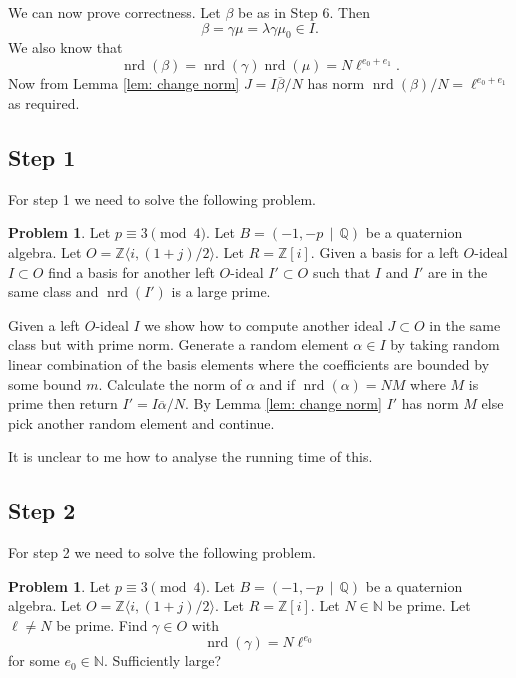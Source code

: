 \documentclass[10pt]{article}
\theoremstyle{plain}
\theoremstyle{definition}
\newtheorem{prob}[theorem]{Problem}
\newcommand{\op}{\operatorname}
\newcommand{\N}{\mathbb{N}}
\newcommand{\Z}{\mathbb{Z}}
\newcommand{\Q}{\mathbb{Q}}
\newcommand{\nrd}{\op{nrd}}
\begin{document}
We can now prove correctness.
Let \( \beta \) be as in Step 6.
Then
\[
    \beta = \gamma \mu = \lambda\gamma\mu_0 \in I.
\]
We also know that
\[
    \nrd(\beta) = \nrd(\gamma) \nrd(\mu) = N\ell^{e_0 + e_1} .
\]
Now from Lemma \ref{lem: change norm} \( J = I\overline{\beta}/N \) has norm \( \nrd(\beta) / N = \ell^{e_0 + e_1} \) as required.

\subsection{Step 1}
For step 1 we need to solve the following problem.

\begin{prob}
    Let \( p \equiv 3 \pmod{4} \).
    Let \( B =  (-1, -p \, \mid \, \Q) \) be a quaternion algebra.
    Let \( O = \Z \langle i, (1+j) / 2 \rangle \).
    Let \( R = \Z[i] \).
    Given a basis for a left \( O \)-ideal \( I \subset O \) find a basis for another left \( O \)-ideal \( I' \subset O \) such that \( I \) and \( I' \) are in the same class and \( \nrd(I') \) is a large prime.
\end{prob}

Given a left \( O \)-ideal \( I \) we show how to compute another ideal \( J \subset O \) in the same class but with prime norm.
Generate a random element \( \alpha \in I \) by taking random linear combination of the basis elements where the coefficients are bounded by some bound \( m \).
Calculate the norm of \( \alpha \) and if \( \nrd(\alpha) = NM \) where \( M \) is prime then return \( I' = I \overline{\alpha} / N \).
By Lemma \ref{lem: change norm} \( I' \) has norm \( M \) else pick another random element and continue.

{\color{red} It is unclear to me how to analyse the running time of this.}


\subsection{Step 2}
For step 2 we need to solve the following problem.

\begin{prob}
    Let \( p \equiv 3 \pmod{4} \).
    Let \( B =  (-1, -p \, \mid \, \Q) \) be a quaternion algebra.
    Let \( O = \Z \langle i, (1+j) / 2 \rangle \).
    Let \( R = \Z[i] \).
    Let \( N \in \N \) be prime.
    Let \( \ell \neq N \) be prime.
    Find \( \gamma \in O \) with
    \[
        \nrd(\gamma) = N\ell^{e_0}
    \]
    for some \( e_0 \in \N \). {\color{red} Sufficiently large?}
\end{prob}
\end{document}
